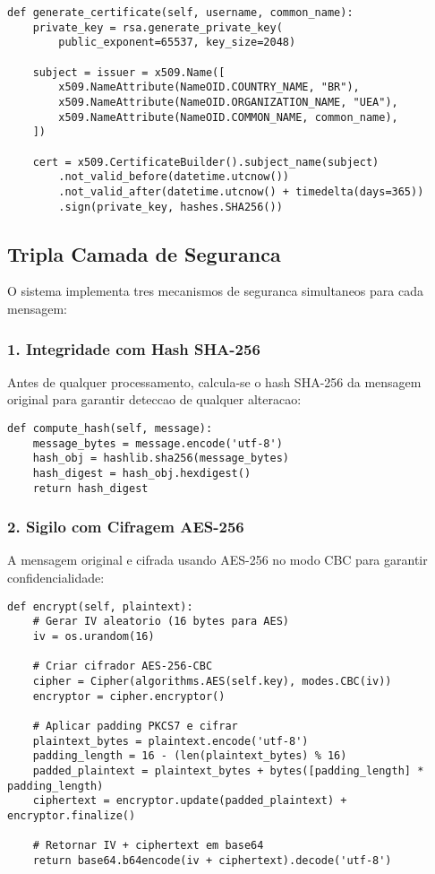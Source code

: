 \documentclass[12pt,a4paper,oneside]{article}
\begin{document}
\begin{lstlisting}[caption=Processo de geracao de certificado]
def generate_certificate(self, username, common_name):
    private_key = rsa.generate_private_key(
        public_exponent=65537, key_size=2048)
    
    subject = issuer = x509.Name([
        x509.NameAttribute(NameOID.COUNTRY_NAME, "BR"),
        x509.NameAttribute(NameOID.ORGANIZATION_NAME, "UEA"),
        x509.NameAttribute(NameOID.COMMON_NAME, common_name),
    ])
    
    cert = x509.CertificateBuilder().subject_name(subject)
        .not_valid_before(datetime.utcnow())
        .not_valid_after(datetime.utcnow() + timedelta(days=365))
        .sign(private_key, hashes.SHA256())
\end{lstlisting}

\subsection{Tripla Camada de Seguranca}

O sistema implementa tres mecanismos de seguranca simultaneos para cada mensagem:

\subsubsection{1. Integridade com Hash SHA-256}

Antes de qualquer processamento, calcula-se o hash SHA-256 da mensagem original para garantir deteccao de qualquer alteracao:

\begin{lstlisting}[caption=Calculo de hash para integridade]
def compute_hash(self, message):
    message_bytes = message.encode('utf-8')
    hash_obj = hashlib.sha256(message_bytes)
    hash_digest = hash_obj.hexdigest()
    return hash_digest
\end{lstlisting}

\subsubsection{2. Sigilo com Cifragem AES-256}

A mensagem original e cifrada usando AES-256 no modo CBC para garantir confidencialidade:

\begin{lstlisting}[caption=Cifragem AES-256-CBC para sigilo]
def encrypt(self, plaintext):
    # Gerar IV aleatorio (16 bytes para AES)
    iv = os.urandom(16)
    
    # Criar cifrador AES-256-CBC
    cipher = Cipher(algorithms.AES(self.key), modes.CBC(iv))
    encryptor = cipher.encryptor()
    
    # Aplicar padding PKCS7 e cifrar
    plaintext_bytes = plaintext.encode('utf-8')
    padding_length = 16 - (len(plaintext_bytes) % 16)
    padded_plaintext = plaintext_bytes + bytes([padding_length] * padding_length)
    ciphertext = encryptor.update(padded_plaintext) + encryptor.finalize()
    
    # Retornar IV + ciphertext em base64
    return base64.b64encode(iv + ciphertext).decode('utf-8')
\end{lstlisting}
\end{document}
